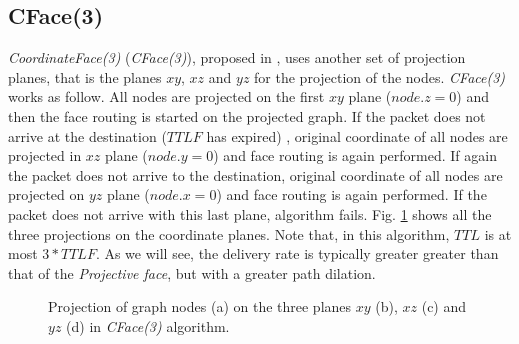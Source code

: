 \documentclass[journal,comsoc]{IEEEtran}
\begin{document}
\subsection{CFace(3)}
\emph{CoordinateFace(3)} (\emph{CFace(3)}), proposed in \cite{abdallah:random}, uses another set of projection planes, that is the planes \(xy\), \(xz\) and \(yz\) for the projection of the nodes. \emph{CFace(3)} works as follow. All nodes are projected on the first \(xy\) plane (\(node.z = 0\)) and then the face routing is started on the projected graph. If the packet does not arrive at the destination (\(TTLF\) has expired) , original coordinate of all nodes are projected in \(xz\) plane (\(node.y = 0\)) and face routing is again performed. If again the packet does not arrive to the destination, original coordinate of all nodes are projected on \(yz\) plane (\(node.x = 0\)) and face routing is again performed. If the packet does not arrive with this last plane, algorithm fails. Fig. \ref{fig:cface} shows all the three projections on the coordinate planes. Note that, in this algorithm, \(TTL\) is at most \(3*TTLF\). As we will see, the delivery rate is typically greater greater than that of the \emph{Projective face}, but with a greater path dilation.

\begin{figure}[!t]
\centering
{}%
%
\qquad
{}%
%
\caption{Projection of graph nodes (a) on the three planes \(xy\) (b), \(xz\) (c) and \(yz\) (d) in \emph{CFace(3)} algorithm.}
\label{fig:cface}
\end{figure}
\end{document}
